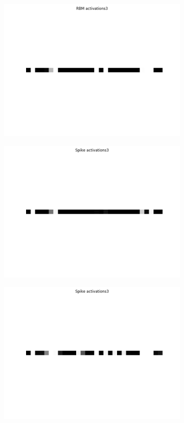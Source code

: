 \begin{figure}
	\begin{subfigure}[t]{.24\textwidth}
  		\centering
  		\includegraphics[width=.9\linewidth]{imgs/convert/rbm00003.png}
  		\label{fig:sub1}
	\end{subfigure}%
	\begin{subfigure}[t]{.24\textwidth}
  		\centering
  		\includegraphics[width=.9\linewidth]{imgs/convert/cnn00003.png}
  		\label{fig:sub2}
	\end{subfigure}
	\begin{subfigure}[t]{.24\textwidth}
  		\centering
  		\includegraphics[width=.9\linewidth]{imgs/convert/coba00003.png}

\end{subfigure}
\end{figure}

